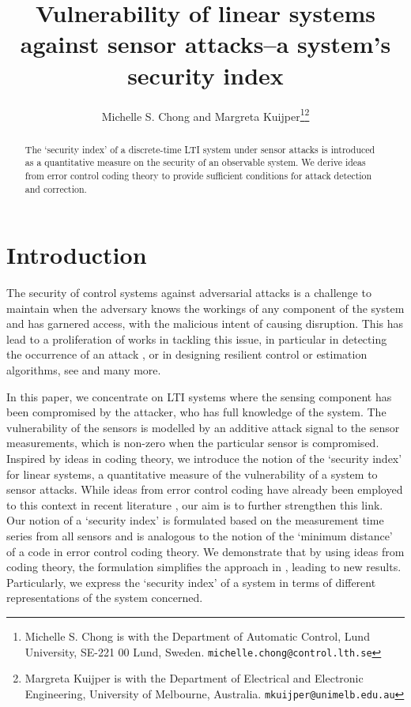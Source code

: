 \documentclass[letterpaper, 10 pt, conference]{ieeeconf}
\title{\LARGE \bf
Vulnerability of linear systems against sensor attacks--a system's security index
}
\author{Michelle S. Chong and Margreta Kuijper\thanks{Michelle S. Chong is with the Department of Automatic Control, Lund University, SE-221 00 Lund, Sweden.
        {\tt\small michelle.chong@control.lth.se}}\thanks{Margreta Kuijper is with the Department of Electrical and Electronic Engineering, University of Melbourne, Australia.
        {\tt\small mkuijper@unimelb.edu.au}}}
\begin{document}
\maketitle
\thispagestyle{empty}
\pagestyle{empty}


\begin{abstract}
The `security index' of a discrete-time LTI system under sensor attacks is introduced as a quantitative measure on the security of an observable system. We derive ideas from error control coding theory to provide sufficient conditions for attack detection and correction. 
\end{abstract}


\section{Introduction}
The security of control systems against adversarial attacks is a challenge to maintain when the adversary knows the workings of any component of the system and has garnered access, with the malicious intent of causing disruption. This has lead to a proliferation of works in tackling this issue, in particular in detecting the occurrence of an attack \cite{pasqualetti2013attack, pasqualetti2012attack, pasqualetti2015divide}, or in designing resilient control or estimation algorithms, see \cite{fawziTD14, shoukry2013event, ChongWakaikiHespanhaACC15, chenKarMouraICASSP15, sandbergTJ2010} and many more.

In this paper, we concentrate on LTI systems where the sensing component has been compromised by the attacker, who has full knowledge of the system. The vulnerability of the sensors is modelled by an additive attack signal to the sensor measurements, which is non-zero when the particular sensor is compromised. Inspired by ideas in coding theory, we introduce the notion of the `security index' for linear systems, a quantitative measure of the vulnerability of a system to sensor attacks. While ideas from error control coding have already been employed to this context in recent literature \cite{fawziTD14}, our aim is to further strengthen this link. Our notion of a `security index' is formulated based on the measurement time series from all sensors and is analogous to the notion of the `minimum distance' of a code in error control coding theory. We demonstrate that by using ideas from coding theory, the formulation simplifies the approach in \cite{fawziTD14}, leading to new results. Particularly, we express the `security index' of a system in terms of different representations of the system concerned. 
 
\end{document}
